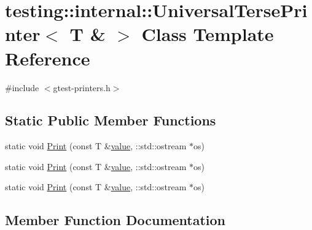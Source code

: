 \hypertarget{classtesting_1_1internal_1_1_universal_terse_printer_3_01_t_01_6_01_4}{}\section{testing\+::internal\+::Universal\+Terse\+Printer$<$ T \& $>$ Class Template Reference}
\label{classtesting_1_1internal_1_1_universal_terse_printer_3_01_t_01_6_01_4}


{\ttfamily \#include $<$gtest-\/printers.\+h$>$}

\subsection*{Static Public Member Functions}
\begin{DoxyCompactItemize}
\item 
static void \mbox{\hyperlink{classtesting_1_1internal_1_1_universal_terse_printer_3_01_t_01_6_01_4_a931f93cc52a3046706c87d0a90640483}{Print}} (const T \&\mbox{\hyperlink{_obj__test_2lib_2googletest-master_2googlemock_2test_2gmock-matchers__test_8cc_a337b8a670efc0b086ad3af163f3121b6}{value}}, \+::std\+::ostream $\ast$os)
\item 
static void \mbox{\hyperlink{classtesting_1_1internal_1_1_universal_terse_printer_3_01_t_01_6_01_4_a931f93cc52a3046706c87d0a90640483}{Print}} (const T \&\mbox{\hyperlink{_obj__test_2lib_2googletest-master_2googlemock_2test_2gmock-matchers__test_8cc_a337b8a670efc0b086ad3af163f3121b6}{value}}, \+::std\+::ostream $\ast$os)
\item 
static void \mbox{\hyperlink{classtesting_1_1internal_1_1_universal_terse_printer_3_01_t_01_6_01_4_a931f93cc52a3046706c87d0a90640483}{Print}} (const T \&\mbox{\hyperlink{_obj__test_2lib_2googletest-master_2googlemock_2test_2gmock-matchers__test_8cc_a337b8a670efc0b086ad3af163f3121b6}{value}}, \+::std\+::ostream $\ast$os)
\end{DoxyCompactItemize}


\subsection{Member Function Documentation}
\mbox{\label{classtesting_1_1internal_1_1_universal_terse_printer_3_01_t_01_6_01_4_a931f93cc52a3046706c87d0a90640483}} 
